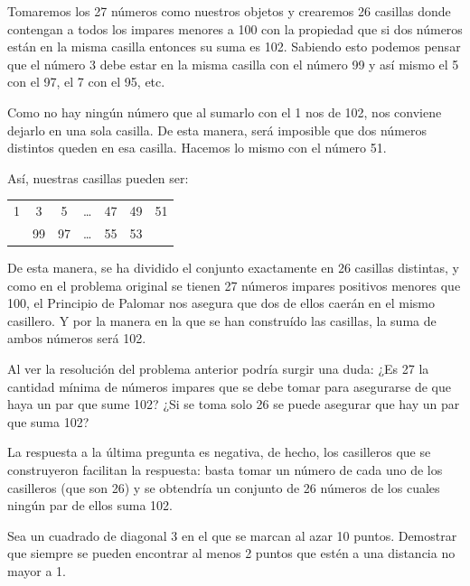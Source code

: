 \documentclass[12pt]{article}
\begin{document}
\begin{solucion}
    Tomaremos los 27 números como nuestros objetos y crearemos 26 casillas donde contengan a todos los impares menores a 100 con la propiedad que si dos números están en la misma casilla entonces su suma es 102. Sabiendo esto podemos pensar que el número 3 debe estar en la misma casilla con el número 99 y así mismo el 5 con el 97, el 7 con el 95, etc.
    
    Como no hay ningún número que al sumarlo con el 1 nos de 102, nos conviene dejarlo en una sola casilla. De esta manera, será imposible que dos números distintos queden en esa casilla. Hacemos lo mismo con el número 51.

    Así, nuestras casillas pueden ser:

    \begin{center}
        \begin{tabular}{|c|c|c|c|c|c|c|}
            \hline
            1 & 3  & 5  & \dots & 47 & 49 & 51 \\
              & 99 & 97 & \dots & 55 & 53 &    \\ \hline
        \end{tabular}
    \end{center}

    De esta manera, se ha dividido el conjunto exactamente en 26 casillas distintas, y como en el problema original se tienen 27 números impares positivos menores que 100, el Principio de Palomar nos asegura que dos de ellos caerán en el mismo casillero.  Y por la manera en la que se han construído las casillas, la suma de ambos números será 102.

    Al ver la resolución del problema anterior podría surgir una duda: ¿Es 27 la cantidad mínima de números impares que se debe tomar para asegurarse de que haya un par que sume 102? ¿Si se toma solo 26 se puede asegurar que hay un par que suma 102?
    
    La respuesta a la última pregunta es negativa, de hecho, los casilleros que se construyeron facilitan la respuesta: basta tomar un número de cada uno de los casilleros (que son 26) y se obtendría un conjunto de 26 números de los cuales ningún par de ellos suma 102.
    
\end{solucion}

\begin{ejemplo}
    Sea un cuadrado de diagonal 3 en el que se marcan al azar 10 puntos. Demostrar que siempre se pueden encontrar al menos 2 puntos que estén a una distancia no mayor a 1.
\end{ejemplo}
\end{document}
